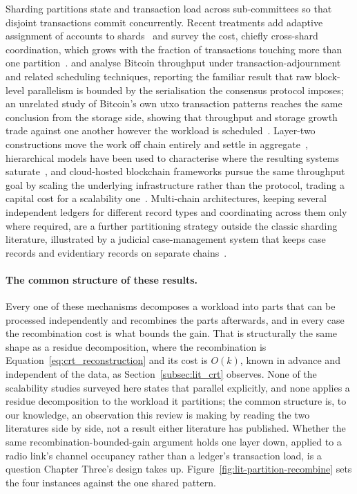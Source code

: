 \documentclass[12pt,a4paper,oneside]{book}
\begin{document}
Sharding partitions state and transaction load across sub-committees so that
disjoint transactions commit concurrently. Recent treatments add adaptive
assignment of accounts to shards~\cite{horvath2025assistedsharding} and survey
the cost, chiefly cross-shard coordination, which grows with the fraction of
transactions touching more than one partition~\cite{anonndscalabilitysolutions}.
\textcite{maiwada2024techniquesimprove} and
\textcite{maiwada2025blockchainscalability} analyse Bitcoin throughput under
transaction-adjournment and related scheduling techniques, reporting the
familiar result that raw block-level parallelism is bounded by the
serialisation the consensus protocol imposes; an unrelated study of Bitcoin's
own \gls{utxo} transaction patterns reaches the same conclusion from the
storage side, showing that throughput and storage growth trade against one
another however the workload is scheduled~\cite{melo2024unlockingblockchain}.
Layer-two constructions move the work off chain entirely and settle in
aggregate~\cite{patel2023blockchainlayer}, hierarchical models have been
used to characterise where the resulting systems
saturate~\cite{sadath2024scalabilityperformance}, and cloud-hosted
blockchain frameworks pursue the same throughput goal by scaling the
underlying infrastructure rather than the protocol, trading a capital cost
for a scalability
one~\cite{anonndoptimizedcloud}. Multi-chain architectures, keeping
several independent ledgers for different record types and coordinating
across them only where required, are a further partitioning strategy
outside the classic sharding literature, illustrated by a judicial
case-management system that keeps case records and evidentiary records on
separate chains~\cite{alyas2025multiblockchain}.

\paragraph{The common structure of these results.}

Every one of these mechanisms decomposes a workload into parts that can be
processed independently and recombines the parts afterwards, and in every case
the recombination cost is what bounds the gain. That is structurally the same
shape as a residue decomposition, where the recombination is
Equation~\ref{eq:crt_reconstruction} and its cost is $O(k)$, known in advance
and independent of the data, as Section~\ref{subsec:lit_crt} observes. None of
the scalability studies surveyed here states that parallel explicitly, and
none applies a residue decomposition to the workload it partitions; the
common structure is, to our knowledge, an observation this review is making
by reading the two literatures side by side, not a result either literature
has published. Whether the same recombination-bounded-gain argument holds one
layer down, applied to a radio link's channel occupancy rather than a
ledger's transaction load, is a question Chapter Three's design takes up.
Figure~\ref{fig:lit-partition-recombine} sets the four instances against the
one shared pattern.
\end{document}
